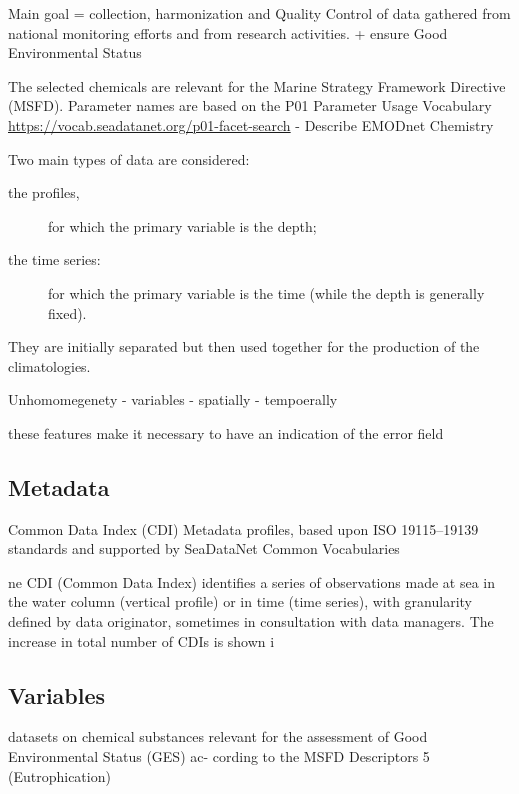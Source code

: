 \documentclass[essd, manuscript]{copernicus}
\begin{document}
Main goal = collection, harmonization and Quality Control of data gathered from national monitoring efforts and from research activities.
+ ensure Good Environmental Status \citep{Vinci2017}

 
The selected chemicals are relevant for the Marine Strategy Framework Directive (MSFD). 
Parameter names are based on the P01 Parameter Usage Vocabulary \url{https://vocab.seadatanet.org/p01-facet-search}
- Describe EMODnet Chemistry \citep{Giorgetti2018}

Two main types of data are considered: 
\begin{description}
\item[the profiles,] for which the primary variable is the depth;
\item[the time series:] for which the primary variable is the time (while the depth is generally fixed).
\end{description}
They are initially separated but then used together for the production of the climatologies. 

Unhomomegenety
- variables
- spatially
- tempoerally

these features make it necessary to have an indication of the error field

%

\subsection{Metadata}

Common Data Index (CDI) Metadata profiles, based upon ISO 19115–19139 standards and supported by SeaDataNet Common Vocabularies

ne CDI (Common Data Index)
identifies a series of observations made at sea in the water column
(vertical profile) or in time (time series), with granularity defined by
data originator, sometimes in consultation with data managers. The
increase in total number of CDIs is shown i

\subsection{Variables}

 datasets on chemical substances
relevant for the assessment of Good Environmental Status (GES) ac-
cording to the MSFD Descriptors 5 (Eutrophication)
\end{document}
